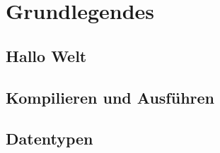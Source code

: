 \chapter{Grundlegendes}

\section{Hallo Welt}

\section{Kompilieren und Ausführen}

\section{Datentypen}


